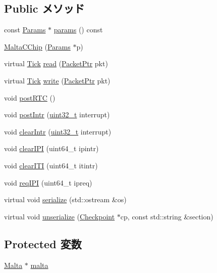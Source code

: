 \subsection*{Public メソッド}
\begin{DoxyCompactItemize}
\item 
const \hyperlink{classMaltaCChip_a7a47c530613bf1fa98cc01dad4ffc4e3}{Params} $\ast$ \hyperlink{classMaltaCChip_acd3c3feb78ae7a8f88fe0f110a718dff}{params} () const 
\item 
\hyperlink{classMaltaCChip_aa4ac6a02ebf51ef5435118450b4908f3}{MaltaCChip} (\hyperlink{classMaltaCChip_a7a47c530613bf1fa98cc01dad4ffc4e3}{Params} $\ast$p)
\item 
virtual \hyperlink{base_2types_8hh_a5c8ed81b7d238c9083e1037ba6d61643}{Tick} \hyperlink{classMaltaCChip_a613ec7d5e1ec64f8d21fec78ae8e568e}{read} (\hyperlink{classPacket}{PacketPtr} pkt)
\item 
virtual \hyperlink{base_2types_8hh_a5c8ed81b7d238c9083e1037ba6d61643}{Tick} \hyperlink{classMaltaCChip_a4cefab464e72b5dd42c003a0a4341802}{write} (\hyperlink{classPacket}{PacketPtr} pkt)
\item 
void \hyperlink{classMaltaCChip_acdd7f639bc4c5a8d164d48a96734d6c1}{postRTC} ()
\item 
void \hyperlink{classMaltaCChip_a9a5bef2d9dc872c3efda198f08e08c62}{postIntr} (\hyperlink{Type_8hh_a435d1572bf3f880d55459d9805097f62}{uint32\_\-t} interrupt)
\item 
void \hyperlink{classMaltaCChip_af0c6cfe896197ad4db6e5d1ab37fe5fb}{clearIntr} (\hyperlink{Type_8hh_a435d1572bf3f880d55459d9805097f62}{uint32\_\-t} interrupt)
\item 
void \hyperlink{classMaltaCChip_ad463cf06091847c5eef7aba24419eee0}{clearIPI} (uint64\_\-t ipintr)
\item 
void \hyperlink{classMaltaCChip_a1bc328d0acc40e7f79412b5b3c9b9395}{clearITI} (uint64\_\-t itintr)
\item 
void \hyperlink{classMaltaCChip_a1f4571959aa97b26452f6accc79abffe}{reqIPI} (uint64\_\-t ipreq)
\item 
virtual void \hyperlink{classMaltaCChip_a53e036786d17361be4c7320d39c99b84}{serialize} (std::ostream \&os)
\item 
virtual void \hyperlink{classMaltaCChip_af22e5d6d660b97db37003ac61ac4ee49}{unserialize} (\hyperlink{classCheckpoint}{Checkpoint} $\ast$cp, const std::string \&section)
\end{DoxyCompactItemize}
\subsection*{Protected 変数}
\begin{DoxyCompactItemize}
\item 
\hyperlink{classMalta}{Malta} $\ast$ \hyperlink{classMaltaCChip_ae7ba1afe6be03355de9c5cbc41c11f96}{malta}
\end{DoxyCompactItemize}


